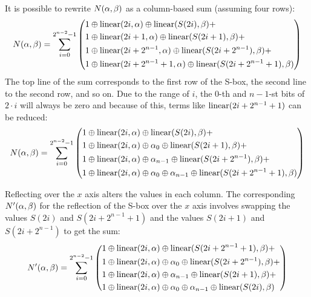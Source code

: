 It is possible to rewrite $N(\alpha,\beta)$ as a column-based sum (assuming four rows):
\[
    N(\alpha,\beta) = \sum_{i=0}^{2^{n-2}-1} \left(
\begin{aligned}
    &1 \oplus \operatorname{linear}(2i,\alpha) \oplus \operatorname{linear}(S(2i),\beta) + \\
    &1 \oplus \operatorname{linear}(2i + 1,\alpha) \oplus \operatorname{linear}(S(2i + 1),\beta) + \\
    &1 \oplus \operatorname{linear}(2i + 2^{n-1},\alpha) \oplus \operatorname{linear}(S(2i + 2^{n-1}),\beta) + \\
    &1 \oplus \operatorname{linear}(2i + 2^{n-1} + 1,\alpha) \oplus \operatorname{linear}(S(2i + 2^{n-1} + 1),\beta)
\end{aligned}
    \right)
\]
The top line of the sum corresponds to the first row of the S-box, the second line to the second row, and so on.
Due to the range of $i$, the $0$-th and $n-1$-st bits of $2 \cdot i$ will always be zero
and because of this, terms like 
$\operatorname{linear}(2i + 2^{n-1} + 1)$ can be reduced:
\[
    N(\alpha,\beta) = \sum_{i=0}^{2^{n-2}-1} \left(
\begin{aligned}
    &1 \oplus \operatorname{linear}(2i,\alpha) \oplus \operatorname{linear}(S(2i),\beta) + \\
    &1 \oplus \operatorname{linear}(2i,\alpha) \oplus \alpha_0 \oplus \operatorname{linear}(S(2i + 1),\beta) + \\
    &1 \oplus \operatorname{linear}(2i,\alpha) \oplus \alpha_{n-1} \oplus \operatorname{linear}(S(2i + 2^{n-1}),\beta) + \\
    &1 \oplus \operatorname{linear}(2i,\alpha) \oplus \alpha_0 \oplus \alpha_{n-1} \oplus \operatorname{linear}(S(2i + 2^{n-1} + 1),\beta)
\end{aligned}
    \right)
\]

Reflecting over the $x$ axis alters the values in each column. 
The corresponding $N'(\alpha,\beta)$ for the reflection of the S-box over the $x$ axis involves swapping the values $S(2i)$ and $S(2i + 2^{n-1} + 1)$ and the values $S(2i+1)$ and $S(2i + 2^{n-1})$ to get the sum: 
\[
    N'(\alpha,\beta) = \sum_{i=0}^{2^{n-2}-1} \left(
\begin{aligned}
    &1 \oplus \operatorname{linear}(2i,\alpha) \oplus \operatorname{linear}(S(2i + 2^{n-1} + 1),\beta) + \\
    &1 \oplus \operatorname{linear}(2i,\alpha) \oplus \alpha_0 \oplus \operatorname{linear}(S(2i + 2^{n-1}),\beta) + \\
    &1 \oplus \operatorname{linear}(2i,\alpha) \oplus \alpha_{n-1} \oplus \operatorname{linear}(S(2i + 1),\beta) + \\
    &1 \oplus \operatorname{linear}(2i,\alpha) \oplus \alpha_0 \oplus \alpha_{n-1} \oplus \operatorname{linear}(S(2i),\beta)
\end{aligned}
    \right)
\]


